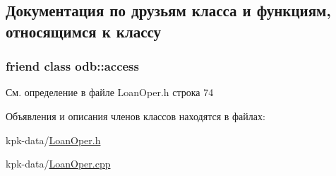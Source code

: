 \subsection{Документация по друзьям класса и функциям, относящимся к классу}
\subsubsection[{\texorpdfstring{odb\+::access}{odb::access}}]{\setlength{\rightskip}{0pt plus 5cm}friend class odb\+::access\hspace{0.3cm}{\ttfamily [friend]}}\hypertarget{classkpk_1_1data_1_1_loan_oper_acb4d953abf85ae525f1d06a0c3a86a55}{}\label{classkpk_1_1data_1_1_loan_oper_acb4d953abf85ae525f1d06a0c3a86a55}


См. определение в файле Loan\+Oper.\+h строка 74



Объявления и описания членов классов находятся в файлах\+:\begin{DoxyCompactItemize}
\item 
kpk-\/data/\hyperlink{_loan_oper_8h}{Loan\+Oper.\+h}\item 
kpk-\/data/\hyperlink{_loan_oper_8cpp}{Loan\+Oper.\+cpp}\end{DoxyCompactItemize}

